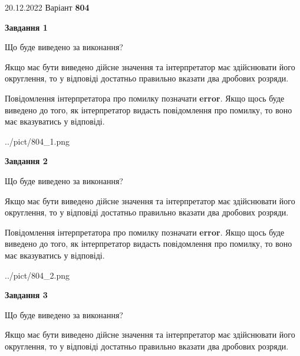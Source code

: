 \documentclass[12pt, ukrainian]{article}
\begin{document}
{20.12.2022 Варіант \No \textbf { 804 }\par}
{
\begin {Large}

{\begin {center}\textbf{Завдання 1}\end {center}}\par
Що буде виведено за виконання? \par

Якщо має бути виведено дійсне значення та інтерпретатор має здійснювати його округлення, 
то у відповіді достатньо правильно вказати два дробових розряди.

Повідомлення інтерпретатора про помилку позначати \textbf{error}.
Якщо щось буде виведено до того, як інтерпретатор видасть повідомлення про помилку, 
то воно має вказуватись у відповіді. \par

\begin{center}
	{../pict/804_1.png}
\end{center}
\newpage

{\begin {center}\textbf{Завдання 2}\end {center}}\par
Що буде виведено за виконання? \par

Якщо має бути виведено дійсне значення та інтерпретатор має здійснювати його округлення, 
то у відповіді достатньо правильно вказати два дробових розряди.

Повідомлення інтерпретатора про помилку позначати \textbf{error}.
Якщо щось буде виведено до того, як інтерпретатор видасть повідомлення про помилку, 
то воно має вказуватись у відповіді. \par

\begin{center}
	{../pict/804_2.png}
\end{center}
\newpage

{\begin {center}\textbf{Завдання 3}\end {center}}\par
Що буде виведено за виконання? \par

Якщо має бути виведено дійсне значення та інтерпретатор має здійснювати його округлення, 
то у відповіді достатньо правильно вказати два дробових розряди.


\end{Large}}
\end{document}
